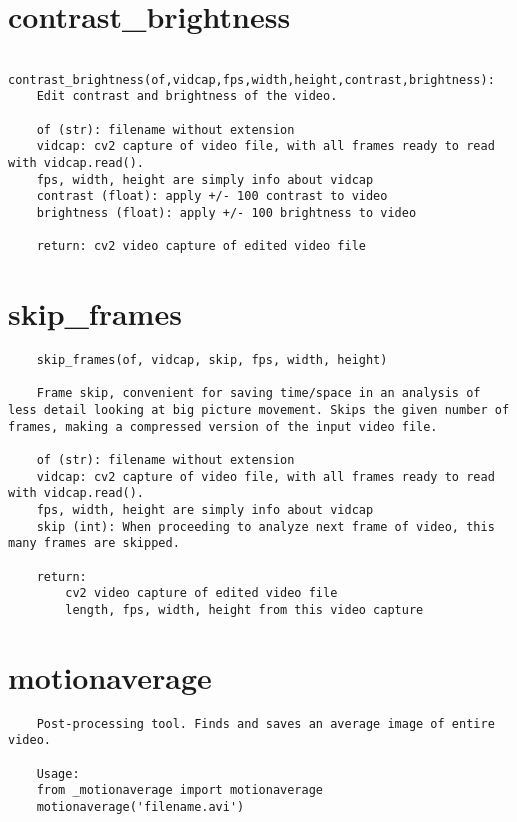 \documentclass[9pt]{extarticle}
\begin{document}
\section*{contrast\_brightness}
\begin{verbatim}
    contrast_brightness(of,vidcap,fps,width,height,contrast,brightness):
    Edit contrast and brightness of the video.
    
    of (str): filename without extension
    vidcap: cv2 capture of video file, with all frames ready to read with vidcap.read().
    fps, width, height are simply info about vidcap
    contrast (float): apply +/- 100 contrast to video
    brightness (float): apply +/- 100 brightness to video
    
    return: cv2 video capture of edited video file
\end{verbatim}

\section*{skip\_frames}
\begin{verbatim}
    skip_frames(of, vidcap, skip, fps, width, height)
    
    Frame skip, convenient for saving time/space in an analysis of less detail looking at big picture movement. Skips the given number of frames, making a compressed version of the input video file.
    
    of (str): filename without extension
    vidcap: cv2 capture of video file, with all frames ready to read with vidcap.read().
    fps, width, height are simply info about vidcap
    skip (int): When proceeding to analyze next frame of video, this many frames are skipped.
    
    return:
        cv2 video capture of edited video file
        length, fps, width, height from this video capture
\end{verbatim}
\section*{motionaverage}
    \begin{verbatim}
	Post-processing tool. Finds and saves an average image of entire video.
    
    Usage:
    from _motionaverage import motionaverage
    motionaverage('filename.avi')
    \end{verbatim}
\end{document}
